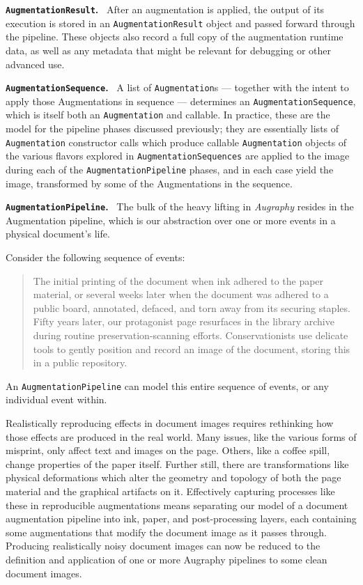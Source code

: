 \documentclass[runningheads]{llncs}
\begin{document}
\smallskip
\noindent\textbf{\texttt{AugmentationResult}.} ~After an augmentation is applied, the output of its execution is stored in an \texttt{AugmentationResult} object and passed forward through the pipeline.
These objects also record a full copy of the augmentation runtime data, as well as any metadata that might be relevant for debugging or other advanced use.

\smallskip
\noindent\textbf{\texttt{AugmentationSequence}.} ~A list of \texttt{Augmentation}s --- together with the intent to apply those Augmentations in sequence --- determines an \texttt{AugmentationSequence}, which is itself both an \texttt{Augmentation} and callable.
In practice, these are the model for the pipeline phases discussed previously; they are essentially lists of \texttt{Augmentation} constructor calls which produce callable \texttt{Augmentation} objects of the various flavors explored in \texttt{AugmentationSequences} are applied to the image during each of the \texttt{AugmentationPipeline} phases, and in each case yield the image, transformed by some of the Augmentations in the sequence.

\smallskip
\noindent\textbf{\texttt{AugmentationPipeline}.} ~The bulk of the heavy lifting in \emph{Augraphy} resides in the Augmentation pipeline, which is our abstraction over one or more events in a physical document's life.

Consider the following sequence of events:
\begin{quote}
The initial printing of the document when ink adhered to the paper material, or several weeks later when the document was adhered to a public board, annotated, defaced, and torn away from its securing staples.
Fifty years later, our protagonist page resurfaces in the library archive during routine preservation-scanning efforts. Conservationists use delicate tools to gently position and record an image of the document, storing this in a public repository.
\end{quote}
An \texttt{AugmentationPipeline} can model this entire sequence of events, or any individual event within.

Realistically reproducing effects in document images requires rethinking how those effects are produced in the real world.
Many issues, like the various forms of misprint, only affect text and images on the page.
Others, like a coffee spill, change properties of the paper itself. Further still, there are transformations like physical deformations which alter the geometry and topology of both the page material and the graphical artifacts on it.
Effectively capturing processes like these in reproducible augmentations means separating our model of a document augmentation pipeline into ink, paper, and post-processing layers, each containing some augmentations that modify the document image as it passes through.
Producing realistically noisy document images can now be reduced to the definition and application of one or more Augraphy pipelines to some clean document images.
\end{document}
